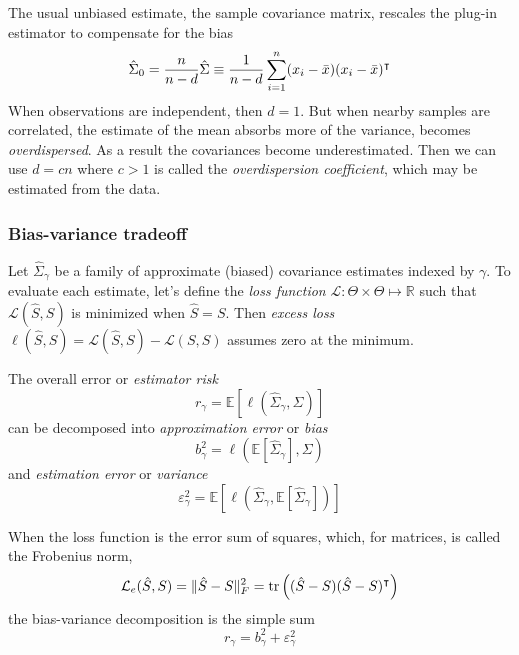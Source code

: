 The usual unbiased estimate, the sample covariance matrix, rescales the plug-in estimator to compensate for the bias
\begin{equation}
\hat\Sigma_0 = \frac n {n - d} \hat\Sigma \equiv \frac 1 {n-d} \sum\limits_{i=1}^n (x_i - \bar x) (x_i - \bar x)^\intercal
\end{equation}
When observations are independent, then $d=1$.  But when nearby samples are correlated, the estimate of the mean absorbs more of the variance, becomes \emph{overdispersed}. As a result the covariances become underestimated. Then we can use $d=cn$ where $c>1$ is called the \emph{overdispersion coefficient}, which may be estimated from the data.

\subsubsection{Bias-variance tradeoff}
Let $\hat\Sigma_\gamma$ be a family of approximate (biased) covariance estimates indexed by $\gamma$. To evaluate each estimate, let's define the \emph{loss function} $\mathcal L : \Theta \times \Theta \mapsto \mathbb R$ such that $\mathcal L(\hat S,S)$ is minimized when $\hat S = S$.  Then \emph{excess loss} $\ell(\hat S, S) = \mathcal L(\hat S, S) - \mathcal L(S,S)$ assumes zero at the minimum.

The overall error or \emph{estimator risk} 
\begin{equation}
r_\gamma = \mathbb E\left[ \ell\left(\hat\Sigma_\gamma,\Sigma\right) \right]
\end{equation}
can be decomposed into \emph{approximation error} or \emph{bias}   
\begin{equation}
b_\gamma^2 = \ell \left( \mathbb E\left[\hat \Sigma_\gamma\right],\Sigma\right)
\end{equation}
and \emph{estimation error} or \emph{variance}
\begin{equation}
\varepsilon_\gamma^2 = \mathbb E \left[ \ell\left(\hat \Sigma_\gamma, 
\mathbb E\left[\hat \Sigma_\gamma\right]\right) \right]
\end{equation}

When the loss function is the error sum of squares, which, for matrices, is called the Frobenius norm, 
\begin{equation}
\mathcal L_e(\hat S,S) = \|\hat S-S\|_F^2 = \operatorname{tr}\left((\hat S-S)(\hat S-S)^\intercal\right)
\end{equation}
the bias-variance decomposition is the simple sum
\begin{equation}
r_\gamma =  b_\gamma^2 + \varepsilon_\gamma^2
\end{equation}

